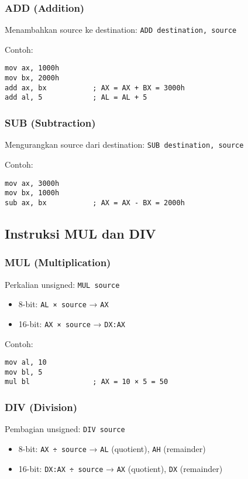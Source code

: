 \documentclass[../main.tex]{subfiles}
\begin{document}
\subsubsection{ADD (Addition)}
Menambahkan source ke destination: \texttt{ADD destination, source}

Contoh:
\begin{verbatim}
mov ax, 1000h
mov bx, 2000h
add ax, bx           ; AX = AX + BX = 3000h
add al, 5            ; AL = AL + 5
\end{verbatim}

\subsubsection{SUB (Subtraction)}
Mengurangkan source dari destination: \texttt{SUB destination, source}

Contoh:
\begin{verbatim}
mov ax, 3000h
mov bx, 1000h
sub ax, bx           ; AX = AX - BX = 2000h
\end{verbatim}

\subsection{Instruksi MUL dan DIV}
\subsubsection{MUL (Multiplication)}
Perkalian unsigned: \texttt{MUL source}

\begin{itemize}
    \item 8-bit: \texttt{AL × source} → \texttt{AX}
    \item 16-bit: \texttt{AX × source} → \texttt{DX:AX}
\end{itemize}

Contoh:
\begin{verbatim}
mov al, 10
mov bl, 5
mul bl               ; AX = 10 × 5 = 50
\end{verbatim}

\subsubsection{DIV (Division)}
Pembagian unsigned: \texttt{DIV source}

\begin{itemize}
    \item 8-bit: \texttt{AX ÷ source} → \texttt{AL} (quotient), \texttt{AH} (remainder)
    \item 16-bit: \texttt{DX:AX ÷ source} → \texttt{AX} (quotient), \texttt{DX} (remainder)
\end{itemize}
\end{document}
